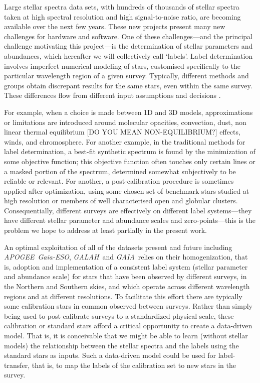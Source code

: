 \documentclass[12pt, preprint]{aastex}
\newcommand{\apogee}{\textsl{APOGEE}}
\newcommand{\galah}{\textsl{GALAH}}
\newcommand{\gaiaeso}{\textsl{Gaia-ESO}}
\newcommand{\gaia}{\textsl{GAIA}}
\begin{document}
Large stellar spectra data sets, with hundreds of thousands of stellar
spectra taken at high spectral resolution and high signal-to-noise
ratio, are becoming available over the next few years.
These new projects present many new challenges for hardware and
software.
One of these challenges---and the principal challenge motivating this
project---is the determination of stellar parameters and abundances,
which hereafter we will collectively call `labels'.
Label determination involves imperfect numerical modeling of stars,
customised specifically to the particular wavelength region of a given
survey.
Typically, different methods and groups obtain discrepant results for
the same stars, even within the same survey.  These differences flow
from different input assumptions and decisions \citep[e.g.]{Sm2014}.

For example, when a choice is made between 1D and 3D models,
approximations or limitations are introduced around molecular
opacities, convection, dust, non linear thermal equilibrium [DO YOU
  MEAN NON-EQUILIBRIUM?] effects, winds, and chromosphere.
For another example, in the traditional methods for label
determination, a best-fit synthetic spectrum is found by the
minimization of some objective function; this objective function often
touches only certain lines or a masked portion of the spectrum,
determined somewhat subjectively to be reliable or relevant.
For another, a post-calibration procedure is sometimes applied after
optimization, using some chosen set of benchmark stars studied at high
resolution or members of well characterised open and globular
clusters.
Consequentially, different surveys are effectively on different label
systems---they have different stellar parameter and abundance scales
and zero-points---this is the problem we hope to address at least
partially in the present work.

An optimal exploitation of all of the datasets present and future
including \apogee\, \gaiaeso, \galah\ and \gaia\ relies on their
homogenization, that is, adoption and implementation of a consistent
label system (stellar parameter and abundance scale) for stars that
have been observed by different surveys, in the Northern and Southern
skies, and which operate across different wavelength regions and at
different resolutions.
To facilitate this effort there are typically some calibration stars
in common observed between surveys.
Rather than simply being used to post-calibrate surveys to a
standardized physical scale, these calibration or standard stars
afford a critical opportunity to create a data-driven model.
That is, it is conceivable that we might be able to learn (without
stellar models) the relationship between the stellar spectra and the
labels using the standard stars as inputs.
Such a data-driven model could be used for label-transfer, that is, to
map the labels of the calibration set to new stars in the survey.
\end{document}
